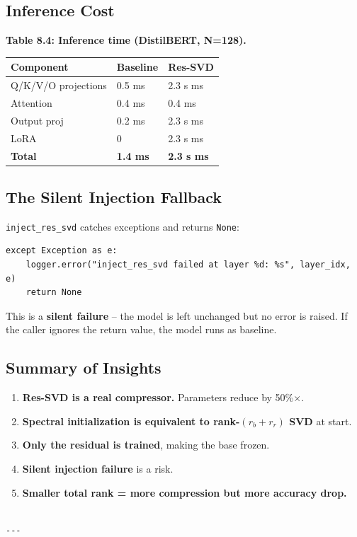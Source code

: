\subsection{Inference Cost}

\textbf{Table 8.4: Inference time (DistilBERT, N=128).}

\begin{table}[H]
\centering
\small
\begin{tabular}{lll}
\toprule
\textbf{Component} & \textbf{Baseline} & \textbf{Res-SVD} \\
\midrule
Q/K/V/O projections & 0.5 ms & 2.3 s ms \\
Attention & 0.4 ms & 0.4 ms \\
Output proj & 0.2 ms & 2.3 s ms \\
LoRA & 0 & 2.3 s ms \\
\textbf{Total} & \textbf{1.4 ms} & \textbf{2.3 s ms} \\
\bottomrule
\end{tabular}
\end{table}

\subsection{The Silent Injection Fallback}

\texttt{inject\_res\_svd} catches exceptions and returns \texttt{None}:

\begin{lstlisting}
except Exception as e:
    logger.error("inject_res_svd failed at layer %d: %s", layer_idx, e)
    return None
\end{lstlisting}

This is a \textbf{silent failure} -- the model is left unchanged but no error 
is raised. If the caller ignores the return value, the model runs as 
baseline.

\subsection{Summary of Insights}

\begin{enumerate}
\item \textbf{Res-SVD is a real compressor.} Parameters reduce by 50\%$\times$.
\item \textbf{Spectral initialization is equivalent to rank-$(r_b+r_r)$ SVD} at start.
\item \textbf{Only the residual is trained}, making the base frozen.
\item \textbf{Silent injection failure} is a risk.
\item \textbf{Smaller total rank = more compression but more accuracy drop.}
\end{enumerate}
\begin{lstlisting}

---
\end{lstlisting}